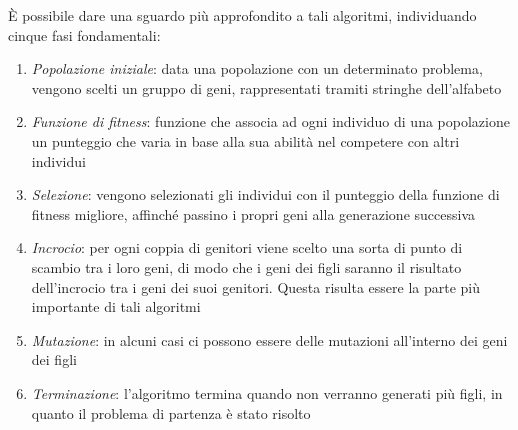 \newline
\`E possibile dare una sguardo più approfondito a tali algoritmi, individuando cinque fasi fondamentali:
\begin{enumerate}
	\item \textit{Popolazione iniziale}: data una popolazione con un determinato problema, vengono scelti un gruppo di geni, rappresentati tramiti stringhe dell'alfabeto
	\item \textit{Funzione di fitness}: funzione che associa ad ogni individuo di una popolazione un punteggio che varia in base alla sua abilità nel competere con altri individui
	\item \textit{Selezione}: vengono selezionati gli individui con il punteggio della funzione di fitness migliore, affinché passino i propri geni alla generazione successiva
	\item \textit{Incrocio}: per ogni coppia di genitori viene scelto una sorta di punto di scambio tra i loro geni, di modo che i geni dei figli saranno il risultato dell'incrocio tra i geni dei suoi genitori. Questa risulta essere la parte più importante di tali algoritmi
	\item \textit{Mutazione}: in alcuni casi ci possono essere delle mutazioni all'interno dei geni dei figli
	\item \textit{Terminazione}: l'algoritmo termina quando non verranno generati più figli, in quanto il problema di partenza è stato risolto
\end{enumerate}

